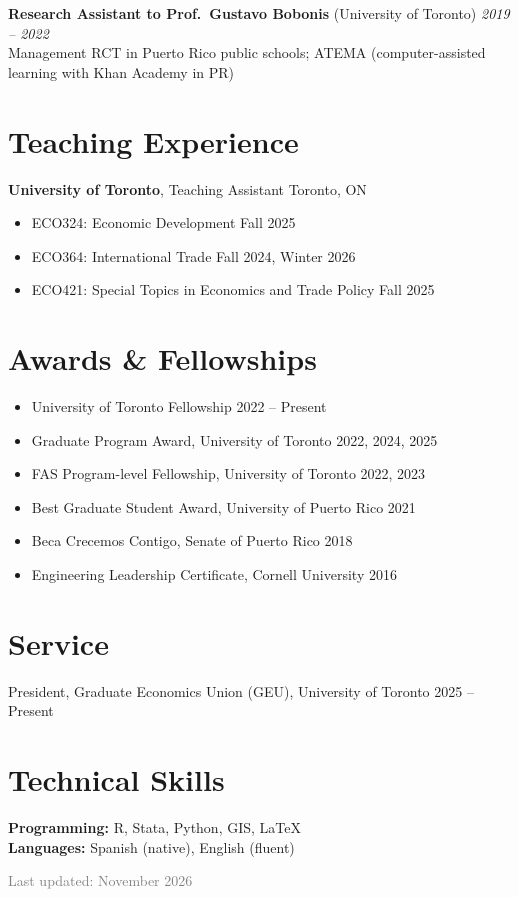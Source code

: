 \documentclass[11pt,letterpaper]{article}
\begin{document}
\textbf{Research Assistant to Prof.\ Gustavo Bobonis} (University of Toronto) \hfill \textit{2019 -- 2022} \\[1pt]
\quad Management RCT in Puerto Rico public schools; ATEMA (computer-assisted learning with Khan Academy in PR)

\section{Teaching Experience}

\textbf{University of Toronto}, Teaching Assistant \hfill Toronto, ON

\begin{itemize}[leftmargin=1.5em, itemsep=1pt, topsep=2pt]
  \item ECO324: Economic Development \hfill Fall 2025
  \item ECO364: International Trade \hfill Fall 2024, Winter 2026
  \item ECO421: Special Topics in Economics and Trade Policy \hfill Fall 2025
\end{itemize}

\section{Awards \& Fellowships}

\begin{itemize}[leftmargin=1.5em, itemsep=0pt, topsep=2pt, parsep=0pt]
  \item University of Toronto Fellowship \hfill 2022 -- Present
  \item Graduate Program Award, University of Toronto \hfill 2022, 2024, 2025
  \item FAS Program-level Fellowship, University of Toronto \hfill 2022, 2023
  \item Best Graduate Student Award, University of Puerto Rico \hfill 2021
  \item Beca Crecemos Contigo, Senate of Puerto Rico \hfill 2018
  \item Engineering Leadership Certificate, Cornell University \hfill 2016
\end{itemize}

\section{Service}

President, Graduate Economics Union (GEU), University of Toronto \hfill 2025 -- Present

\section{Technical Skills}

\textbf{Programming:} R, Stata, Python, GIS, \LaTeX \\
\textbf{Languages:} Spanish (native), English (fluent)

\vfill
\begin{center}
  \small\textcolor{gray}{Last updated: November 2026}
\end{center}
\end{document}

